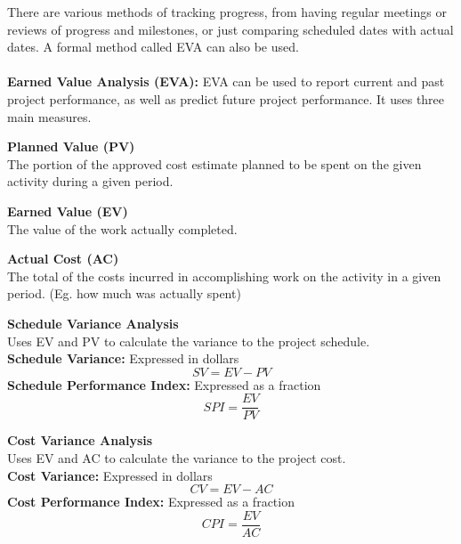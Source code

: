 \documentclass[a4paper,10pt]{article}
\begin{document}
There are various methods of tracking progress, from having regular meetings or reviews of progress and milestones, or just comparing scheduled dates with actual dates. A formal method called EVA can also be used. \\\\
\textcolor{BlueGreen}{\textbf{Earned Value Analysis (EVA):}}
EVA can be used to report current and past project performance, as well as predict future project performance. It uses three main measures. 
\begin{shaded}
	\noindent \textcolor{Emerald}{\textbf{Planned Value (PV)}} \\
	The portion of the approved cost estimate planned to be spent on the given activity during a given period. 
\end{shaded}
\begin{shaded}
	\noindent \textcolor{Emerald}{\textbf{Earned Value (EV)}} \\
	The value of the work actually completed. 
\end{shaded}
\begin{shaded}
	\noindent \textcolor{Emerald}{\textbf{Actual Cost (AC)}} \\
	The total of the costs incurred in accomplishing work on the activity in a given period. (Eg. how much was actually spent)
\end{shaded}
\begin{shaded}
	\noindent \textcolor{Emerald}{\textbf{Schedule Variance Analysis}} \\
	Uses EV and PV to calculate the variance to the project schedule. \\
	\textbf{Schedule Variance:} Expressed in dollars
	\begin{equation*}
		SV = EV - PV
	\end{equation*}
	\textbf{Schedule Performance Index:} Expressed as a fraction 
	\begin{equation*}
		SPI = \frac{EV}{PV}
	\end{equation*}
\end{shaded}
\begin{shaded}
	\noindent \textcolor{Emerald}{\textbf{Cost Variance Analysis}} \\
	Uses EV and AC to calculate the variance to the project cost. \\
	\textbf{Cost Variance:} Expressed in dollars
	\begin{equation*}
		CV = EV - AC
	\end{equation*}
	\textbf{Cost Performance Index:} Expressed as a fraction 
	\begin{equation*}
		CPI = \frac{EV}{AC}
	\end{equation*}
\end{shaded}
\end{document}
